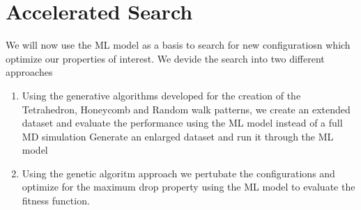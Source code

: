 \section{Accelerated Search}

We will now use the \acrshort{ML} model as a basis to search for new configuratiosn which optimize our properties of interest. We devide the search into two different approaches
\begin{enumerate}
  \item Using the generative algorithms developed for the creation of the Tetrahedron, Honeycomb and Random walk patterns, we create an extended dataset and evaluate the performance using the \acrshort{ML} model instead of a full \acrshort{MD} simulation 
  Generate an enlarged dataset and run it through the ML model 
  \item Using the genetic algoritm approach we pertubate the configurations and optimize for the maximum drop property using the \acrshort{ML} model to evaluate the fitness function. 
\end{enumerate}


